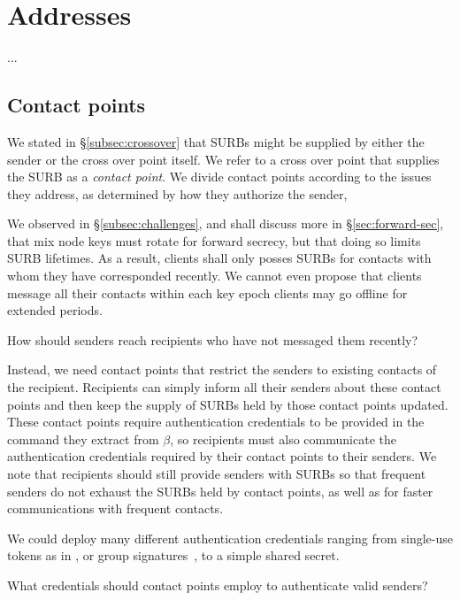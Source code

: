 
\section{Addresses}

...


\subsection{Contact points}\label{subsec:contact_points}

We stated in \S\ref{subsec:crossover} that SURBs might be supplied
by either the sender or the cross over point itself.  We refer to 
a cross over point that supplies the SURB as a {\em contact point}.
We divide contact points according to the issues they address,
as determined by how they authorize the sender,

We observed in \S\ref{subsec:challenges}, and shall discuss more in
\S\ref{sec:forward-sec}, that mix node keys must rotate for forward
secrecy, but that doing so limits SURB lifetimes.  
As a result, clients shall only posses SURBs for contacts with whom
they have corresponded recently.  We cannot even propose that clients
message all their contacts within each key epoch clients may go
offline for extended periods.

\begin{issue}
How should senders reach recipients who have not messaged them recently?
\end{issue}

Instead, we need contact points that restrict the senders to existing
contacts of the recipient.  Recipients can simply inform all their
senders about these contact points and then keep the supply of SURBs
held by those contact points updated.  These contact points require
authentication credentials to be provided in the command they extract
from $\beta$, so recipients must also communicate the authentication
credentials required by their contact points to their senders.
We note that recipients should still provide senders with SURBs so
that frequent senders do not exhaust the SURBs held by contact points,
as well as for faster communications with frequent contacts.

We could deploy many different authentication credentials ranging 
from single-use tokens as in \cite{agl-pond-hmac}, or
 group signatures~\cite{BBS,VLR}, to a simple shared secret.

\begin{issue}
What credentials should contact points employ to authenticate valid senders?
\end{issue}

